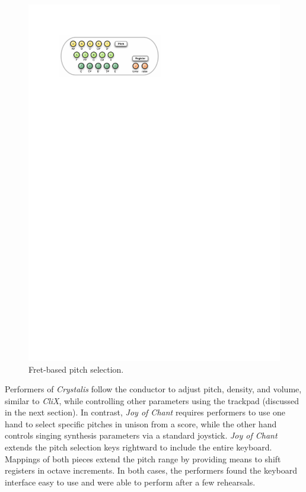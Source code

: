 \begin{figure}[t]
\begin{center}
\includegraphics[width=\textwidth]{img-1-eps-converted-to.pdf}
\caption{Fret-based pitch selection.}
\label{fiebrink:fig:1} 
\end{center}
\end{figure}

Performers of \textit{Crystalis} follow the conductor to adjust pitch, density,
and volume, similar to \textit{CliX}, while controlling other parameters using
the trackpad (discussed in the next section). In contrast, \textit{Joy of Chant}
requires performers to use one hand to select specific pitches in unison from a
score, while the other hand controls singing synthesis parameters via a standard
joystick. \textit{Joy of Chant} extends the pitch selection keys rightward to
include the entire keyboard. Mappings of both pieces extend the pitch range by
providing means to shift registers in octave increments. In both cases, the
performers found the keyboard interface easy to use and were able to perform
after a few rehearsals.


